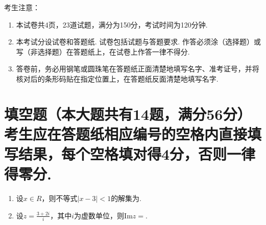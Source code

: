 \documentclass[12pt,space]{ctexart} %
\begin{document}
\juemi%
{\heiti 考生注意：}
\begin{enumerate}[itemsep=-0.3em,topsep=0pt]
\item 本试卷共4页，23道试题，满分为150分，考试时间为120分钟.
\item 本考试分设试卷和答题纸. 试卷包括试题与答题要求. 作答必须涂（选择题）或写（非选择题）在答题纸上，在试卷上作答一律不得分.
\item 答卷前，务必用钢笔或圆珠笔在答题纸正面清楚地填写名字、准考证号，并将核对后的条形码贴在指定位置上，在答题纸反面清楚地填写名字.
\end{enumerate}

\section{填空题（本大题共有14题，满分56分）考生应在答题纸相应编号的空格内直接填写结果，每个空格填对得4分，否则一律得零分.}
\begin{enumerate}[itemsep=-0.3em,topsep=0pt]
  \item 设$x\in R$，则不等式$|x-3|<1$的解集为.
  \item 设$\displaystyle{z=\frac{3+2i}{i}}$，其中$i$为虚数单位，则$\text{Im} z=$.
\end{enumerate}


\clearpage
\end{document}
